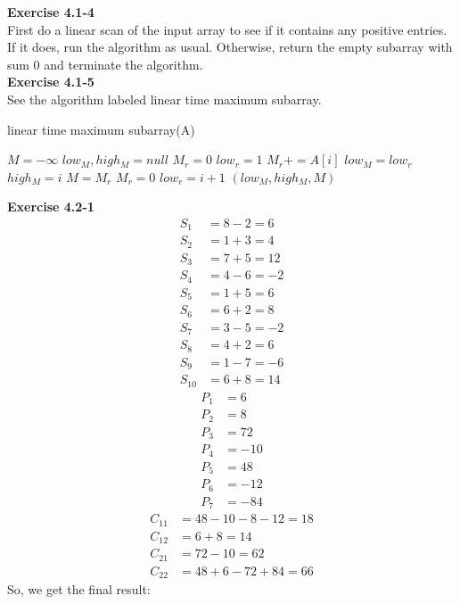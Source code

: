 \documentclass{article}
\begin{document}
\noindent\textbf{Exercise 4.1-4}\\

First do a linear scan of the input array to see if it contains any positive entries.  If it does, run the algorithm as usual.  Otherwise, return the empty subarray with sum 0 and terminate the algorithm. \\

\noindent\textbf{Exercise 4.1-5}\\

See the algorithm labeled linear time maximum subarray.

\begin{algorithm}
\caption{linear time maximum subarray(A)}
\begin{algorithmic}[1]
\State $M =-\infty$
\State $low_M, high_M = null$
\State $M_r = 0$
\State $low_r = 1$
\State $M_r += A[i]$
\State $low_M = low_r$
\State $high_M = i$
\State $M= M_r$
\EndIf
{}
\State $M_r = 0$
\State $low_r = i+1$
\EndIf
\State \Return $(low_M,high_M,M)$
\EndFor


\end{algorithmic}
\end{algorithm}

\noindent\textbf{Exercise 4.2-1}\\

\begin{align*}
S_1 &= 8-2=6\\
S_2 &= 1+3 = 4\\
S_3 &=7+5 = 12\\
S_4 &=4-6 = -2\\
S_5 &=1+5=6\\
S_6 &=6+2=8\\
S_7 &=3-5=-2\\
S_8 &=4 +2=6\\
S_9 &=1-7 = -6\\
S_{10} &=6+8=14
\end{align*}
\begin{align*}
P_1 &=6\\
P_2 &=8\\
P_3 &=72\\
P_4 &=-10\\
P_5 &=48\\
P_6 &=-12\\
P_7 &=-84
\end{align*}
\begin{align*}
C_{11} &=48 -10-8-12 = 18\\
C_{12} &= 6+8 = 14\\
C_{21} &= 72-10 = 62\\
C_{22} &=48+6-72+84 = 66
\end{align*}
So, we get the final result:
\end{document}
